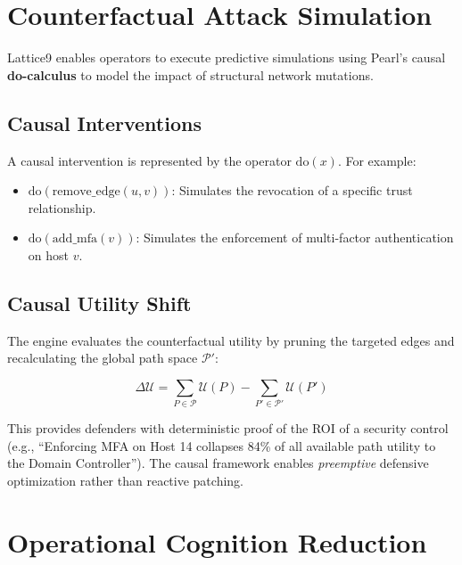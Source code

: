 \documentclass[11pt,a4paper]{article}
\theoremstyle{definition}
\numberwithin{equation}{section}
\newcommand{\set}[1]{\mathcal{#1}}
\begin{document}
\section{Counterfactual Attack Simulation}\label{sec:counterfactual}

Lattice9 enables operators to execute predictive simulations using Pearl's causal \textbf{do-calculus} to model the impact of structural network mutations.

\subsection{Causal Interventions}\label{subsec:causal}

A causal intervention is represented by the operator $\text{do}(x)$. For example:
\begin{itemize}[leftmargin=2em]
    \item $\text{do}(\text{remove\_edge}(u, v))$: Simulates the revocation of a specific trust relationship.
    \item $\text{do}(\text{add\_mfa}(v))$: Simulates the enforcement of multi-factor authentication on host $v$.
\end{itemize}

\subsection{Causal Utility Shift}\label{subsec:causal-utility}

The engine evaluates the counterfactual utility by pruning the targeted edges and recalculating the global path space $\set{P}'$:

\begin{equation}\label{eq:causal-utility}
\Delta\set{U} = \sum_{P \in \set{P}} \set{U}(P) - \sum_{P' \in \set{P}'} \set{U}(P')
\end{equation}

This provides defenders with deterministic proof of the ROI of a security control (e.g., ``Enforcing MFA on Host 14 collapses 84\% of all available path utility to the Domain Controller''). The causal framework enables \emph{preemptive} defensive optimization rather than reactive patching.

\section{Operational Cognition Reduction}\label{sec:cognition}
\end{document}
